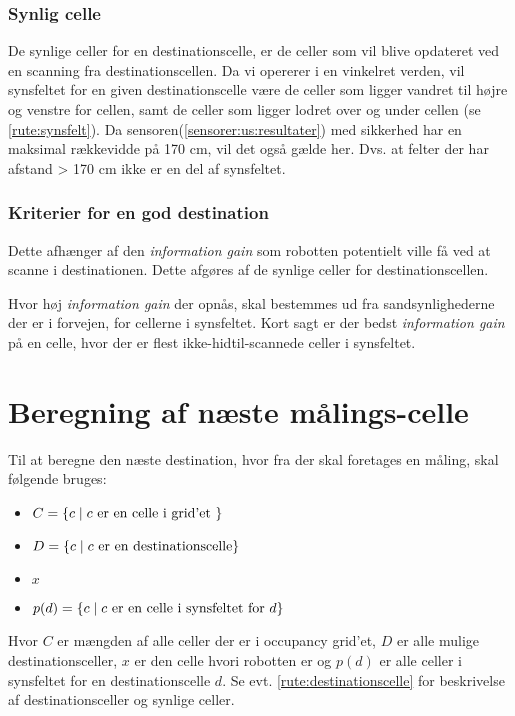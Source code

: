 \subsubsection{Synlig celle}\label{rute:synligcelle}
De synlige celler for en destinationscelle, er de celler som vil blive opdateret ved en scanning fra destinationscellen.
Da vi opererer i en vinkelret verden, vil synsfeltet for en given destinationscelle være de celler som ligger vandret til højre og venstre for cellen, samt de celler som ligger lodret over og under cellen (se \cref{rute:synsfelt}).
Da sensoren(\cref{sensorer:us:resultater}) med sikkerhed har en maksimal rækkevidde på 170 cm, vil det også gælde her.
Dvs. at felter der har afstand > 170 cm ikke er en del af synsfeltet.

\subsubsection{Kriterier for en god destination}
Dette afhænger af den \textit{information gain} som robotten potentielt ville få ved at scanne i destinationen.
Dette afgøres af de synlige celler for destinationscellen.

Hvor høj \textit{information gain} der opnås, skal bestemmes ud fra sandsynlighederne der er i forvejen, for cellerne i synsfeltet.
Kort sagt er der bedst \textit{information gain} på en celle, hvor der er flest ikke-hidtil-scannede celler i synsfeltet.

\section{Beregning af næste målings-celle}
Til at beregne den næste destination, hvor fra der skal foretages en måling, skal følgende bruges:
\begin{itemize}
\item{$C = \{ c \mid c \textnormal{ er en celle i grid'et } \}$}
\item{$D = \{ c \mid c \textnormal{ er en destinationscelle}\}$}
\item{$x$}
\item{$p(d) = \{ c \mid c \textnormal{ er en celle i synsfeltet for } d \}$}
\end{itemize}
Hvor $C$ er mængden af alle celler der er i occupancy grid'et, $D$ er alle mulige destinationsceller, $x$ er den celle hvori robotten er og $p(d)$ er alle celler i synsfeltet for en destinationscelle $d$.
Se evt. \cref{rute:destinationscelle} for beskrivelse af destinationsceller og synlige celler.

